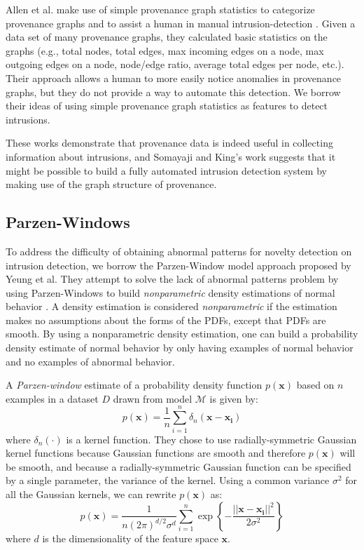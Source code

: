 \documentclass[10pt,twocolumn]{article}
\newcommand{\m}[1]{\mathbf{#1}}
\begin{document}
Allen et al. make use of simple provenance graph statistics to categorize provenance graphs and to assist a human
in manual intrusion-detection \cite{provstat}. Given a data set of many provenance graphs, they calculated basic statistics
on the graphs (e.g., total nodes, total edges, max incoming edges on a node, max outgoing edges on a node,
node/edge ratio, average total edges per node, etc.). Their approach allows a human to more easily
notice anomalies in provenance graphs, but they do not provide a way to automate this detection.
We borrow their ideas of using simple provenance graph statistics as features to detect intrusions.

These works demonstrate that provenance data is indeed useful in collecting information about intrusions, and
Somayaji and King's work suggests that it might be possible to build a fully automated intrusion detection
system by making use of the graph structure of provenance.

\subsection{Parzen-Windows}

To address the difficulty of obtaining abnormal patterns for novelty detection on intrusion detection, we borrow
the Parzen-Window model approach proposed by Yeung et al.
They attempt to solve the lack of abnormal patterns problem by using Parzen-Windows to build {\em nonparametric}
density estimations of normal behavior \cite{parzen}. A density estimation is considered {\em nonparametric} if the estimation
makes no assumptions about the forms of the PDFs, except that PDFs are smooth. By using a nonparametric
density estimation, one can build a probability density estimate of normal behavior by only having examples of normal
behavior and no examples of abnormal behavior.

A {\em Parzen-window} estimate of a probability density function $p(\m{x})$
based on $n$ examples in a dataset $D$ drawn from model $\mathcal{M}$ is given by:
$$p(\m{x}) = \frac{1}{n} \sum_{i=1}^n \delta_n (\m{x} - \m{x_i})$$
where $\delta_n(\cdot)$ is a kernel function. They chose to use radially-symmetric Gaussian kernel functions because
Gaussian functions are smooth and therefore $p(\m{x})$ will be smooth, and because a radially-symmetric Gaussian function
can be specified by a single parameter, the variance of the kernel. Using a common variance $\sigma^2$ for all
the Gaussian kernels, we can rewrite $p(\m{x})$ as:
$$p(\m{x}) = \frac{1}{n(2\pi)^{d/2} \sigma^d} \sum_{i=1}^n  \exp \left\{  - \frac{|| \m{x} - \m{x_i}||^2}{2 \sigma^2}  \right\}$$
where $d$ is the dimensionality of the feature space $\m{x}$.
\end{document}
